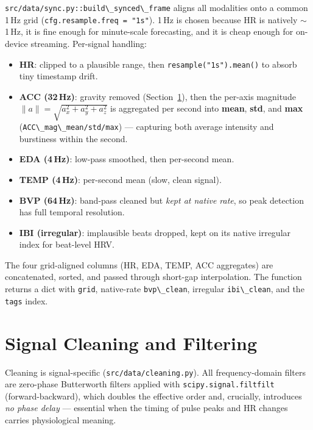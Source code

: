 \documentclass[11pt,a4paper]{article}
\newcommand{\code}[1]{\lstinline[basicstyle=\ttfamily\normalsize]!#1!}
\begin{document}
\code{src/data/sync.py::build\_synced\_frame} aligns all modalities onto a common
1\,Hz grid (\code{cfg.resample.freq = "1s"}). 1\,Hz is chosen because HR is
natively $\sim$1\,Hz, it is fine enough for minute-scale forecasting, and it is
cheap enough for on-device streaming. Per-signal handling:

\begin{itemize}[leftmargin=1.4em,itemsep=2pt]
\item \textbf{HR}: clipped to a plausible range, then \code{resample("1s").mean()}
      to absorb tiny timestamp drift.
\item \textbf{ACC (32\,Hz)}: gravity removed (Section~\ref{sec:clean}), then the
      per-axis magnitude
      $\lVert a \rVert = \sqrt{a_x^2 + a_y^2 + a_z^2}$
      is aggregated per second into \textbf{mean}, \textbf{std}, and \textbf{max}
      (\code{ACC\_mag\_mean/std/max}) --- capturing both average intensity and
      burstiness within the second.
\item \textbf{EDA (4\,Hz)}: low-pass smoothed, then per-second mean.
\item \textbf{TEMP (4\,Hz)}: per-second mean (slow, clean signal).
\item \textbf{BVP (64\,Hz)}: band-pass cleaned but \emph{kept at native rate}, so
      peak detection has full temporal resolution.
\item \textbf{IBI (irregular)}: implausible beats dropped, kept on its native
      irregular index for beat-level HRV.
\end{itemize}

The four grid-aligned columns (HR, EDA, TEMP, ACC aggregates) are concatenated,
sorted, and passed through short-gap interpolation. The function returns a dict
with \code{grid}, native-rate \code{bvp\_clean}, irregular \code{ibi\_clean}, and
the \code{tags} index.

\section{Signal Cleaning and Filtering}\label{sec:clean}

Cleaning is signal-specific (\code{src/data/cleaning.py}). All frequency-domain
filters are zero-phase Butterworth filters applied with
\code{scipy.signal.filtfilt} (forward-backward), which doubles the effective
order and, crucially, introduces \emph{no phase delay} --- essential when the
timing of pulse peaks and HR changes carries physiological meaning.
\end{document}
